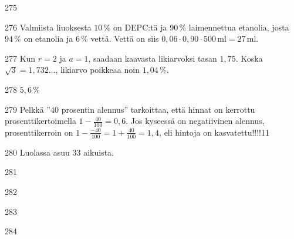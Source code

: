 \begin{Vastaus}{275}
	
\end{Vastaus}
\begin{Vastaus}{276}
	Valmiista liuoksesta $10\,$\% on DEPC:tä ja $90\,$\% laimennettua etanolia, josta $94\,$\% on etanolia ja $6$\,\% vettä. Vettä on siis $0,06\cdot0,90\cdot500$\,ml$=27$\,ml.
	
\end{Vastaus}
\begin{Vastaus}{277}
    Kun $r=2$ ja $a=1$, saadaan kaavasta likiarvoksi tasan $1,75$. Koska $\sqrt{3}=1,732\ldots$, likiarvo poikkeaa noin $1,04\,\%$.
    
\end{Vastaus}
\begin{Vastaus}{278}
        $5,6\,\%$
    
\end{Vastaus}
\begin{Vastaus}{279}
	Pelkkä ''$40$ prosentin alennus'' tarkoittaa, että hinnat on kerrottu prosenttikertoimella $1-\frac{40}{100}=0,6$. Jos kyseessä on negatiivinen alennus, prosenttikerroin on $1-\frac{-40}{100}=1+\frac{40}{100}=1,4$, eli hintoja on kasvatettu!!!!11
	
\end{Vastaus}
\begin{Vastaus}{280}
	Luolassa asuu $33$ aikuista.
	
\end{Vastaus}
\begin{Vastaus}{281}
	
\end{Vastaus}
\begin{Vastaus}{282}
	
\end{Vastaus}
\begin{Vastaus}{283}
	
\end{Vastaus}
\begin{Vastaus}{284}
	
\end{Vastaus}

